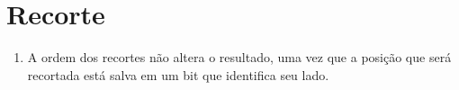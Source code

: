 \section*{Recorte}

	\begin{enumerate} \addtocounter{enumi}{20}
		\item  
		 A ordem dos recortes não altera o resultado, uma vez que a posição que será
		recortada está salva em um bit que identifica seu lado.
	\end{enumerate}
